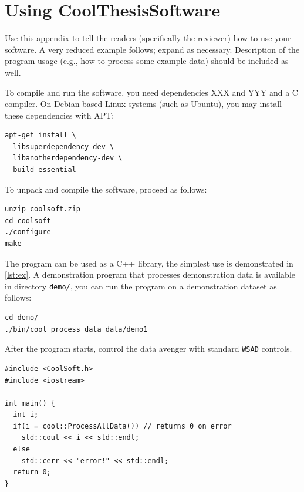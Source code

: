 \chapter{Using CoolThesisSoftware}

Use this appendix to tell the readers (specifically the reviewer) how to use your software. A very reduced example follows; expand as necessary. Description of the program usage (e.g., how to process some example data) should be included as well.

To compile and run the software, you need dependencies XXX and YYY and a C compiler. On Debian-based Linux systems (such as Ubuntu), you may install these dependencies with APT:
\begin{Verbatim}
apt-get install \
  libsuperdependency-dev \
  libanotherdependency-dev \
  build-essential
\end{Verbatim}

To unpack and compile the software, proceed as follows:
\begin{Verbatim}
unzip coolsoft.zip
cd coolsoft
./configure
make
\end{Verbatim}

The program can be used as a C++ library, the simplest use is demonstrated in \cref{lst:ex}. A demonstration program that processes demonstration data is available in directory \verb|demo/|, you can run the program on a demonstration dataset as follows:
\begin{Verbatim}
cd demo/
./bin/cool_process_data data/demo1
\end{Verbatim}

After the program starts, control the data avenger with standard \verb-WSAD- controls.

\begin{listing}
\begin{lstlisting}
#include <CoolSoft.h>
#include <iostream>

int main() {
  int i;
  if(i = cool::ProcessAllData()) // returns 0 on error
    std::cout << i << std::endl;
  else
    std::cerr << "error!" << std::endl;
  return 0;
}
\end{lstlisting}
\caption{Example program.}
\label{lst:ex}
\end{listing}
